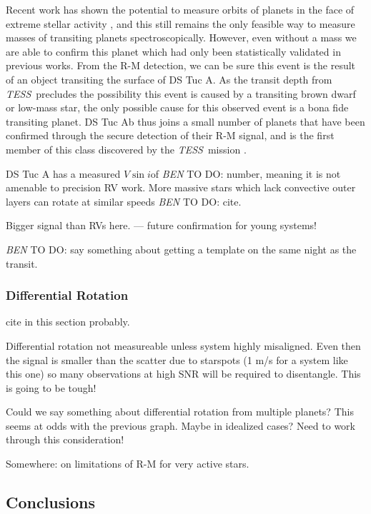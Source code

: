 \documentclass[twocolumn]{aastex63}
\newcommand{\tess}{{\it TESS}}
\newcommand{\vsini}{{$V \sin i$}}
\newcommand{\todo}[3]{{\color{#2} \emph{#1} TO DO: #3}}
\newcommand{\btmtodo}[1]{\todo{BEN}{blue}{#1}}
\begin{document}
Recent work has shown the potential to measure orbits of planets in the face of extreme stellar activity \citep{Barragan19}, and this still remains the only feasible way to measure masses of transiting planets spectroscopically. 
However, even without a mass we are able to confirm this planet which had only been statistically validated in previous works. 
From the R-M detection, we can be sure this event is the result of an object transiting the surface of DS Tuc A. 
As the transit depth from \tess\ precludes the possibility this event is caused by a transiting brown dwarf or low-mass star, the only possible cause for this observed event is a bona fide transiting planet.
DS Tuc Ab thus joins a small number of planets that have been confirmed through the secure detection of their R-M signal, and is the first member of this class discovered by the \tess\ mission \citep{Jenkins10b, Hirano12b}. 

DS Tuc A has a measured \vsini of \btmtodo{number}, meaning it is not amenable to precision RV work.
More massive stars which lack convective outer layers can rotate at similar speeds \btmtodo{cite}.

Bigger signal than RVs here. --- future confirmation for young systems!


\btmtodo{say something about getting a template on the same night as the transit.}

\subsubsection{Differential Rotation}



cite \citet{Giminez06} in this section probably.


Differential rotation not measureable unless system highly misaligned. Even then the signal is smaller than the scatter due to starspots (1 m/s for a system like this one) so many observations at high SNR will be required to disentangle. This is going to be tough!

Could we say something about differential rotation from multiple planets? This seems at odds with the previous graph. Maybe in idealized cases? Need to work through this consideration!


Somewhere: \citet{Oshagh18} on limitations of R-M for very active stars.


\subsection{Conclusions}
\end{document}
